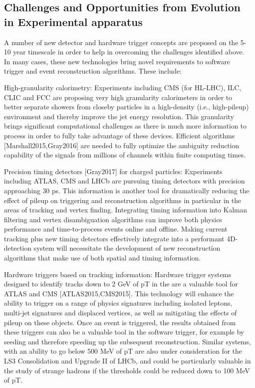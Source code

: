 \subsection{Challenges and Opportunities from Evolution in Experimental apparatus}

A number of new detector and hardware trigger concepts are proposed on the 5-10 year timescale in order to help in overcoming the challenges identified above. In many cases, these new technologies bring novel requirements to software trigger and event reconstruction algorithms. These include:

High-granularity calorimetry: Experiments including CMS (for HL-LHC), ILC, CLIC and FCC are proposing very high granularity calorimeters in order to better separate showers from closeby particles in a high-density (i.e., high-pileup) environment and thereby improve the jet energy resolution. This granularity brings significant computational challenges as there is much more information to process in order to fully take advantage of these devices. Efficient algorithms [Marshall2015,Gray2016] are needed to fully optimize the ambiguity reduction capability of the signals from millions of channels within finite computing times. 

Precision timing detectors [Gray2017] for charged particles: Experiments including ATLAS, CMS and LHCb are pursuing timing detectors with precision approaching 30 ps. This information is another tool for dramatically reducing the effect of pileup on triggering and reconstruction algorithms in particular in the areas of tracking and vertex finding. Integrating timing information into Kalman filtering and vertex disambiguation algorithms can improve both physics performance and time-to-process events online and offline. Making current tracking plus new timing detectors effectively integrate into a performant 4D-detection system will necessitate the development of new reconstruction algorithms that make use of both spatial and timing information. 

Hardware triggers based on tracking information: Hardware trigger systems designed to identify tracks down to 2 GeV of pT in the are a valuable tool for ATLAS and CMS [ATLAS2015,CMS2015]. This technology will enhance the ability to trigger on a range of physics signatures including isolated leptons, multi-jet signatures and displaced vertices, as well as mitigating the effects of pileup on these objects. Once an event is triggered, the results obtained from these triggers can also be a valuable tool in the software trigger, for example by seeding and therefore speeding up the subsequent reconstruction. Similar systems, with an ability to go below 500 MeV of pT are also under consideration for the LS3 Consolidation and Upgrade II of LHCb, and could be particularly valuable in the study of strange hadrons if the thresholds could be reduced down to 100 MeV of pT.

